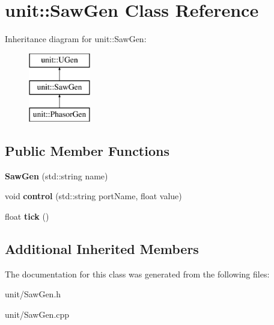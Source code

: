 \hypertarget{classunit_1_1SawGen}{}\section{unit\+:\+:Saw\+Gen Class Reference}
\label{classunit_1_1SawGen}
Inheritance diagram for unit\+:\+:Saw\+Gen\+:\begin{figure}[H]
\begin{center}
\leavevmode
\includegraphics[height=3.000000cm]{classunit_1_1SawGen}
\end{center}
\end{figure}
\subsection*{Public Member Functions}
\begin{DoxyCompactItemize}
\item 
{\bfseries Saw\+Gen} (std\+::string name)\hypertarget{classunit_1_1SawGen_a24c35afc1bdb237a8a5d1eb3888ce0bc}{}\label{classunit_1_1SawGen_a24c35afc1bdb237a8a5d1eb3888ce0bc}

\item 
void {\bfseries control} (std\+::string port\+Name, float value)\hypertarget{classunit_1_1SawGen_a515f6eb82a1a97ee434144b8c58133b8}{}\label{classunit_1_1SawGen_a515f6eb82a1a97ee434144b8c58133b8}

\item 
float {\bfseries tick} ()\hypertarget{classunit_1_1SawGen_a18c6704aec8f20a5605ff72d674c7516}{}\label{classunit_1_1SawGen_a18c6704aec8f20a5605ff72d674c7516}

\end{DoxyCompactItemize}
\subsection*{Additional Inherited Members}


The documentation for this class was generated from the following files\+:\begin{DoxyCompactItemize}
\item 
unit/Saw\+Gen.\+h\item 
unit/Saw\+Gen.\+cpp\end{DoxyCompactItemize}
